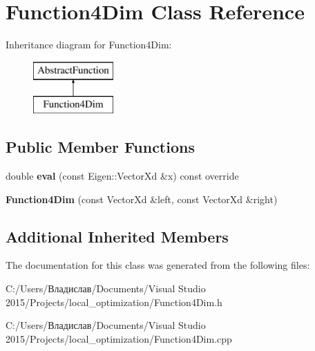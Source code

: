 \section{Function4\+Dim Class Reference}
\label{class_function4_dim}
Inheritance diagram for Function4\+Dim\+:\begin{figure}[H]
\begin{center}
\leavevmode
\includegraphics[height=2.000000cm]{class_function4_dim}
\end{center}
\end{figure}
\subsection*{Public Member Functions}
\begin{DoxyCompactItemize}
\item 
\mbox{\label{class_function4_dim_a7cfaeb2c4990cdac1d121bc516443dfe}} 
double {\bfseries eval} (const Eigen\+::\+Vector\+Xd \&x) const override
\item 
\mbox{\label{class_function4_dim_af54a4af564cca44274794581c66b271e}} 
{\bfseries Function4\+Dim} (const Vector\+Xd \&left, const Vector\+Xd \&right)
\end{DoxyCompactItemize}
\subsection*{Additional Inherited Members}


The documentation for this class was generated from the following files\+:\begin{DoxyCompactItemize}
\item 
C\+:/\+Users/Владислав/\+Documents/\+Visual Studio 2015/\+Projects/local\+\_\+optimization/Function4\+Dim.\+h\item 
C\+:/\+Users/Владислав/\+Documents/\+Visual Studio 2015/\+Projects/local\+\_\+optimization/Function4\+Dim.\+cpp\end{DoxyCompactItemize}
